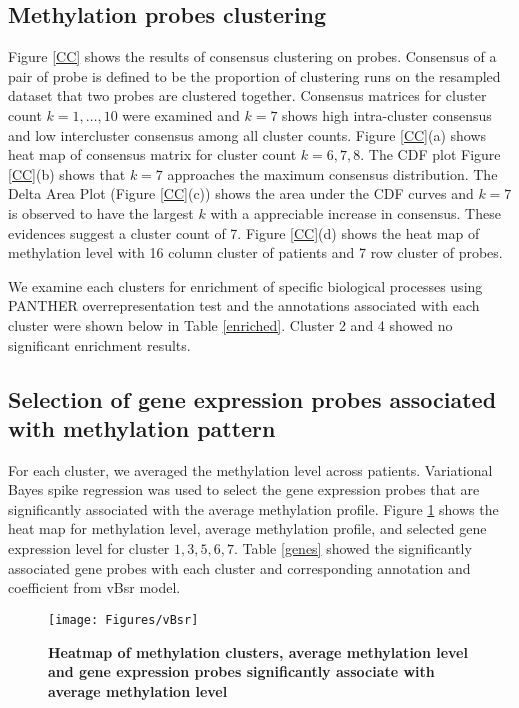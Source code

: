 \documentclass{article}
\begin{document}
\subsection{Methylation probes clustering}

Figure \ref{CC} shows the results of consensus clustering on probes. Consensus of a pair of probe is defined to be the proportion of clustering runs on the resampled dataset that two probes are clustered together. Consensus matrices for cluster count $k = 1, \dots, 10$ were examined and $k = 7$ shows high intra-cluster consensus and low intercluster consensus among all cluster counts. Figure \ref{CC}(a) shows heat map of consensus matrix for cluster count $k = 6, 7, 8$. The CDF plot Figure \ref{CC}(b) shows that $k = 7$ approaches the maximum consensus distribution. The Delta Area Plot (Figure \ref{CC}(c)) shows the area under the CDF curves and $k = 7$ is observed to have the largest $k$ with a appreciable increase in consensus. These evidences suggest a cluster count of 7. Figure \ref{CC}(d) shows the heat map of methylation level with 16 column cluster of patients and 7 row cluster of probes. 

We examine each clusters for enrichment of specific biological processes using PANTHER overrepresentation test \citep{mi2013large} and the annotations associated with each cluster were shown below in Table \ref{enriched}. Cluster 2 and 4 showed no significant enrichment results. 

\subsection{Selection of gene expression probes associated with methylation pattern}

For each cluster, we averaged the methylation level across patients. Variational Bayes spike regression was used to select the gene expression probes that are significantly associated with the average methylation profile. Figure \ref{heatmap} shows the heat map for methylation level, average methylation profile, and selected gene expression level for cluster $1, 3, 5, 6, 7$. Table \ref{genes} showed the significantly associated gene probes with each cluster and corresponding annotation and coefficient from vBsr model. 

\begin{figure*}[htb!]
\centering
\texttt{[image: Figures/vBsr]}
\caption{\textbf{Heatmap of methylation clusters, average methylation level and gene expression probes significantly associate with average methylation level} }
\label{heatmap}
\end{figure*}
\end{document}
